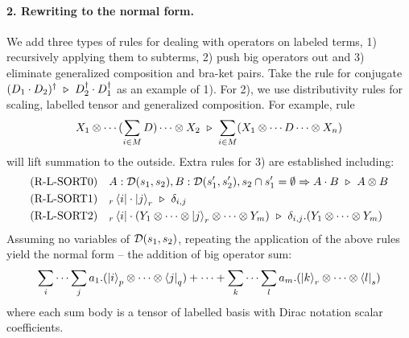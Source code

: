 \paragraph*{2. Rewriting to the normal form.}
We add three types of rules for dealing with operators on labeled terms, 1) recursively applying them to subterms, 2) push big operators out and 3) eliminate generalized composition and bra-ket pairs.
Take the rule for conjugate $(D_1 \cdot D_2)^\dagger \ \triangleright\ D_2^\dagger \cdot D_1^\dagger$ as an example of 1).
For 2), we use distributivity rules for scaling, labelled tensor and generalized composition. For example, rule
\[
X_1 \otimes \cdots (\sum_{i \in M} D) \cdots \otimes X_2\ \triangleright\ \sum_{i \in M} (X_1 \otimes \cdots D \cdots \otimes X_n)
\]
will lift summation to the outside.
Extra rules for 3) are established including:
\begin{align*}
    & \textrm{(R-L-SORT0)}
    && A : \mathcal{D}(s_1, s_2), B : \mathcal{D}(s_1', s_2'), s_2 \cap s_1'=\emptyset \Rightarrow A \cdot B \ \triangleright\ A \otimes B \\
    & \textrm{(R-L-SORT1)}
    && {}_r\bra{i}\cdot\ket{j}_r \ \triangleright\ \delta_{i, j} \\
    & \textrm{(R-L-SORT2)}
    && {}_r\bra{i}\cdot(Y_1 \otimes \cdots \otimes \ket{j}_r \otimes \cdots \otimes Y_m) \ \triangleright\ \delta_{i, j}.(Y_1  \otimes \cdots \otimes Y_m)
\end{align*}
Assuming no variables of $\mathcal{D}(s_1, s_2)$, 
repeating the application of the above rules yield the normal form -- the addition of big operator sum: 
\begin{equation}
  \label{eqn:Labelled normal}
  \sum_{i}\cdots\sum_{j} a_1 . (\ket{i}_{p} \otimes \cdots \otimes \bra{j}_{q})
  + \cdots +
  \sum_{k}\cdots\sum_{l} a_m . (\ket{k}_{r} \otimes \cdots \otimes \bra{l}_{s})
\end{equation}
where each sum body is a tensor of labelled basis with Dirac notation scalar coefficients.
